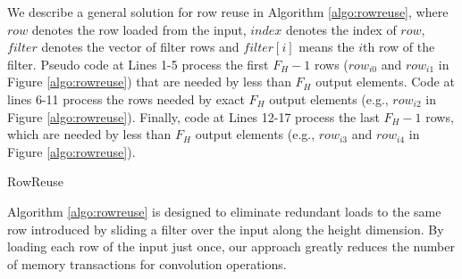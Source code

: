 We describe a general solution for row reuse in Algorithm \ref{algo:rowreuse}, where $row$ denotes the row loaded from the input, $index$ denotes the index of $row$, $filter$ denotes the vector of filter rows and $filter[i]$ means the $i$th row of the filter.
Pseudo code at Lines 1-5 process the first $F_H-1$ rows ($row_{i0}$ and $row_{i1}$ in Figure \ref{algo:rowreuse}) that are needed by less than $F_H$ output elements.
Code at lines 6-11 process the rows needed by exact $F_H$ output elements (e.g., $row_{i2}$ in Figure \ref{algo:rowreuse}).
Finally, code at Lines 12-17 process the last $F_H-1$ rows, which are needed by less than $F_H$ output elements (e.g., $row_{i3}$ and $row_{i4}$ in Figure \ref{algo:rowreuse}).

\begin{algorithm}[t!]
\small
	\caption{RowReuse}
	\label{algo:rowreuse}
\end{algorithm}

Algorithm \ref{algo:rowreuse} is designed to eliminate redundant loads to the same row introduced by sliding a filter over the input along the height dimension.
By loading each row of the input just once, our approach greatly reduces the number of memory transactions for convolution operations.

